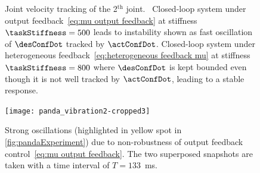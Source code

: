 \begin{figure}[ht]
	\centering
	\caption{Joint velocity tracking of the 2$^{\text{th}}$ joint.~ Closed-loop system under output feedback~\cref{eq:mu output feedback} at stiffness $\taskStiffness=500$ leads to instability shown as fast oscillation of $\desConfDot$ tracked by $\actConfDot$.  Closed-loop system under heterogeneous feedback~\cref{eq:heterogeneous feedback mu} at stiffness $\taskStiffness=800$ where $\desConfDot$ is kept bounded even though it is not well tracked by $\actConfDot$, leading to a stable response.}
	\label{fig:panda-velTracking}
\end{figure}
\begin{figure}
	\centering
	\texttt{[image: panda\_vibration2-cropped3]}
	\caption{Strong oscillations (highlighted in yellow spot in \cref{fig:pandaExperiment}) due to non-robustness of output feedback control~\cref{eq:mu output feedback}. The two superposed snapshots are taken with a time interval of $ T = 133$~ms.}
	\label{fig:panda_vib}
\end{figure}
